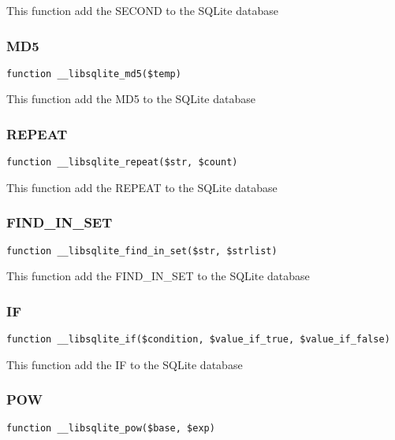 \documentclass[a4paper]{article}
\begin{document}
This function add the SECOND to the SQLite database

\hypertarget{toc311}{}
\subsubsection{MD5}

\begin{lstlisting}
function __libsqlite_md5($temp)
\end{lstlisting}

This function add the MD5 to the SQLite database

\hypertarget{toc312}{}
\subsubsection{REPEAT}

\begin{lstlisting}
function __libsqlite_repeat($str, $count)
\end{lstlisting}

This function add the REPEAT to the SQLite database

\hypertarget{toc313}{}
\subsubsection{FIND\_IN\_SET}

\begin{lstlisting}
function __libsqlite_find_in_set($str, $strlist)
\end{lstlisting}

This function add the FIND\_IN\_SET to the SQLite database

\hypertarget{toc314}{}
\subsubsection{IF}

\begin{lstlisting}
function __libsqlite_if($condition, $value_if_true, $value_if_false)
\end{lstlisting}

This function add the IF to the SQLite database

\hypertarget{toc315}{}
\subsubsection{POW}

\begin{lstlisting}
function __libsqlite_pow($base, $exp)
\end{lstlisting}
\end{document}
